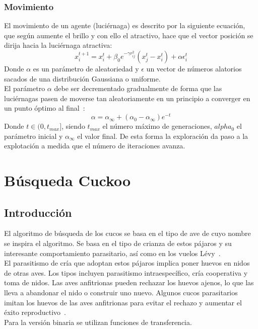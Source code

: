 \subsubsection{Movimiento}
El movimiento de un agente (luciérnaga) es descrito por la siguiente ecuación, que según aumente el brillo y con ello el atractivo, hace que el vector posición se dirija hacia la luciérnaga atractiva:
\begin{equation}
    x_i^{t+1} = x_i^t + \beta_0e^{-\gamma r_{ij}^2}(x_j^t-x_i^t)+\alpha\epsilon_i^t
\end{equation}
Donde $\alpha$ es un parámetro de aleatoriedad y $\epsilon$ un vector de números alatorios sacados de una distribución Gaussiana o uniforme. \\[6pt]
El parámetro $\alpha$ debe ser decrementado gradualmente de forma que las luciérnagas pasen de moverse tan aleatoriamente en un principio a converger en un punto óptimo al final~\cite{yang_chapter_2014}:
\begin{equation}
    \alpha = \alpha_\infty + (\alpha_0-\alpha_\infty)e^{-t}
\end{equation}
Donde $t\in(0,t_{max}]$, siendo $t_{max}$ el número máximo de generaciones, $alpha_0$ el parámetro inicial y $\alpha_\infty$ el valor final. De esta forma la exploración da paso a la explotación a medida que el número de iteraciones avanza.

\section{Búsqueda Cuckoo}
\subsection{Introducción}
El algoritmo de búsqueda de los cucos se basa en el tipo de ave de cuyo nombre se inspira el algoritmo. Se basa en el tipo de crianza de estos pájaros y su interesante comportamiento parasitario, así como en los vuelos Lévy~\cite{noauthor_levy_nodate}.\\[6pt]
El parasitismo de cría que adoptan estos pájaros implica poner huevos en nidos de otras aves. Los tipos incluyen parasitismo intraespecífico, cría cooperativa y toma de nidos. Las aves anfitrionas pueden rechazar los huevos ajenos, lo que las lleva a abandonar el nido o construir uno nuevo. Algunos cucos parasitarios imitan los huevos de las aves anfitrionas para evitar el rechazo y aumentar el éxito reproductivo~\cite{yang_cuckoo_2010}.\\[6pt]
Para la versión binaria se utilizan funciones de transferencia.
